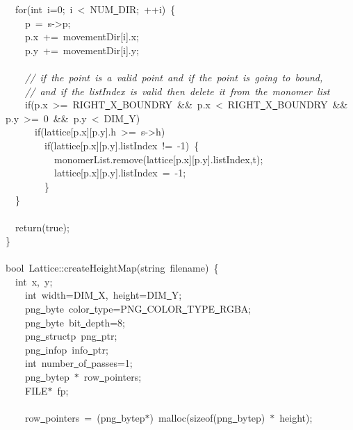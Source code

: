 {\ \ for(int\ i=0;\ i\ <{}\ NUM\underline\ DIR;\ ++i)\ \{\\
\ \ \ \ p\ =\ s-{}>{}p;\\
\ \ \ \ p.x\ +=\ movementDir[i].x;\\
\ \ \ \ p.y\ +=\ movementDir[i].y;\\
\ \\
\ \ \ \ \textsl{//\ if\ the\ point\ is\ a\ valid\ point\ and\ if\ the\ point\ is\ going\ to\ bound,}\\
\ \ \ \ \textsl{//\ and\ if\ the\ listIndex\ is\ valid\ then\ delete\ it\ from\ the\ monomer\ list}\\
\ \ \ \ if(p.x\ >{}=\ RIGHT\underline\ X\underline\ BOUNDRY\ \&\&\ p.x\ <{}\ RIGHT\underline\ X\underline\ BOUNDRY\ \&\&\ p.y\ >{}=\ 0\ \&\&\ p.y\ <{}\ DIM\underline\ Y)\\
\ \ \ \ \ \ if(lattice[p.x][p.y].h\ >{}=\ s-{}>{}h)\\
\ \ \ \ \ \ \ \ if(lattice[p.x][p.y].listIndex\ !=\ -{}1)\ \{\\
\ \ \ \ \ \ \ \ \ \ monomerList.remove(lattice[p.x][p.y].listIndex,t);\\
\ \ \ \ \ \ \ \ \ \ lattice[p.x][p.y].listIndex\ =\ -{}1;\\
\ \ \ \ \ \ \ \ \}\\
\ \ \}\\
\ \\
\ \ return(true);\\
\}\\
\ \\
bool\ Lattice::createHeightMap(string\ filename)\ \{\\
\ \ int\ x,\ y;\\
\ \ \ \ int\ width=DIM\underline\ X,\ height=DIM\underline\ Y;\\
\ \ \ \ png\underline\ byte\ color\underline\ type=PNG\underline\ COLOR\underline\ TYPE\underline\ RGBA;\\
\ \ \ \ png\underline\ byte\ bit\underline\ depth=8;\\
\ \ \ \ png\underline\ structp\ png\underline\ ptr;\\
\ \ \ \ png\underline\ infop\ info\underline\ ptr;\\
\ \ \ \ int\ number\underline\ of\underline\ passes=1;\\
\ \ \ \ png\underline\ bytep\ $\ast$\ row\underline\ pointers;\\
\ \ \ \ FILE$\ast$\ fp;\\
\ \\
\ \ \ \ row\underline\ pointers\ =\ (png\underline\ bytep$\ast$)\ malloc(sizeof(png\underline\ bytep)\ $\ast$\ height);\\
}
